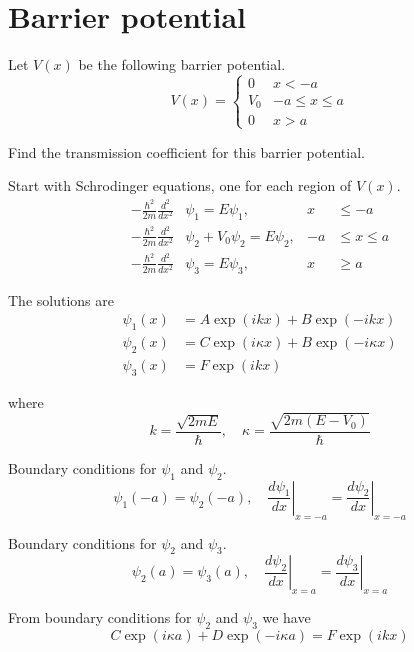 

\section*{Barrier potential}

Let $V(x)$ be the following barrier potential.
\begin{equation*}
V(x)=\begin{cases}
0 & x<-a
\\
V_0 & -a\le x\le a
\\
0 & x>a
\end{cases}
\end{equation*}

Find the transmission coefficient for this barrier potential.

\bigskip
Start with Schrodinger equations, one for each region of $V(x)$.
\begin{align*}
-\frac{\hbar^2}{2m}\frac{d^2}{dx^2}&\psi_1=E\psi_1, & x&\le-a
\\[1ex]
-\frac{\hbar^2}{2m}\frac{d^2}{dx^2}&\psi_2+V_0\psi_2=E\psi_2, & -a&\le x\le a
\\[1ex]
-\frac{\hbar^2}{2m}\frac{d^2}{dx^2}&\psi_3=E\psi_3, & x&\ge a
\end{align*}

The solutions are
\begin{align*}
\psi_1(x)&=A\exp(ikx)+B\exp(-ikx)
\\
\psi_2(x)&=C\exp(i\kappa x)+B\exp(-i\kappa x)
\\
\psi_3(x)&=F\exp(ikx)
\end{align*}

where
\begin{equation*}
k=\frac{\sqrt{2mE}}{\hbar},\quad
\kappa=\frac{\sqrt{2m(E-V_0)}}{\hbar}
\end{equation*}

Boundary conditions for $\psi_1$ and $\psi_2$.
\begin{equation*}
\psi_1(-a)=\psi_2(-a),\quad
\left.\frac{d\psi_1}{dx}\right|_{x=-a}=\left.\frac{d\psi_2}{dx}\right|_{x=-a}
\end{equation*}

Boundary conditions for $\psi_2$ and $\psi_3$.
\begin{equation*}
\psi_2(a)=\psi_3(a),\quad
\left.\frac{d\psi_2}{dx}\right|_{x=a}=\left.\frac{d\psi_3}{dx}\right|_{x=a}
\end{equation*}

From boundary conditions for $\psi_2$ and $\psi_3$ we have
\begin{equation*}
C\exp(i\kappa a)+D\exp(-i\kappa a)=F\exp(ikx)\tag{1}
\end{equation*}

